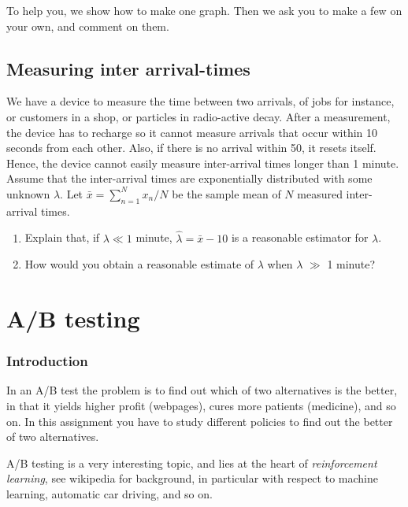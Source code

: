 \documentclass[a4paper]{article}
\begin{document}
To help you, we show how to make one graph. Then we ask you to make a few on your own, and comment on them.



\subsection{Measuring inter arrival-times}
\label{sec:orgf820334}

We have a device to measure the time between two arrivals, of jobs for instance, or customers in a shop, or particles in radio-active decay.
After a measurement, the device has to recharge so it cannot measure arrivals that occur within 10 seconds from each other.
Also, if there is no arrival within 50, it resets itself.
Hence, the device cannot easily measure inter-arrival times longer than 1 minute. Assume that the inter-arrival times are exponentially distributed with some unknown \(\lambda\). Let \(\bar x = \sum_{n=1}^N x_{n} /N\) be the sample mean of \(N\) measured inter-arrival times. 

\begin{enumerate}
\item Explain that, if \(\lambda \ll 1\) minute,  \(\hat \lambda = \bar x - 10\) is a reasonable estimator for \(\lambda\).
\item How would you obtain a reasonable estimate of \(\lambda\) when \(\lambda\) \(\gg\) 1 minute?
\end{enumerate}




\section{A/B testing}
\label{sec:org180b96a}
\subsubsection{Introduction}
\label{sec:org41a02a9}

In an A/B test the problem is to find out which of two alternatives is the better, in that it yields higher profit (webpages), cures more patients (medicine), and so on. In this assignment you have to study different policies to find out the better of two alternatives. 

A/B testing is a very interesting topic, and lies at the heart of \emph{reinforcement learning}, see wikipedia for background, in particular with respect to machine learning, automatic car driving, and so on. 
\end{document}
